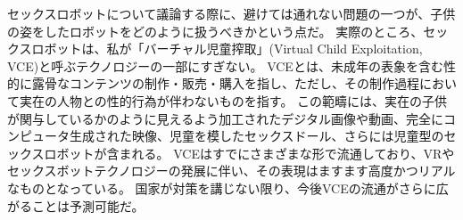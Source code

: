 \documentclass[paper=a4,book,openany]{jlreq}
\begin{document}
セックスロボットについて議論する際に、避けては通れない問題の一つが、子供の姿をしたロボットをどのように扱うべきかという点だ。
実際のところ、セックスロボットは、私が「バーチャル児童搾取」(Virtual Child Exploitation, VCE)と呼ぶテクノロジーの一部にすぎない。
VCEとは、未成年の表象を含む性的に露骨なコンテンツの制作・販売・購入を指し、ただし、その制作過程において実在の人物との性的行為が伴わないものを指す。
この範疇には、実在の子供が関与しているかのように見えるよう加工されたデジタル画像や動画、完全にコンピュータ生成された映像、児童を模したセックスドール、さらには児童型のセックスロボットが含まれる。
VCEはすでにさまざまな形で流通しており、VRやセックスボットテクノロジーの発展に伴い、その表現はますます高度かつリアルなものとなっている。
国家が対策を講じない限り、今後VCEの流通がさらに広がることは予測可能だ。
\end{document}
